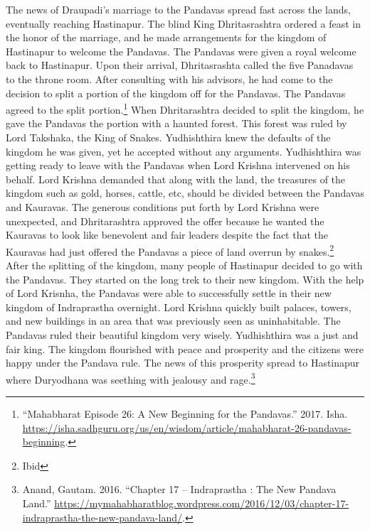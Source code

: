 \documentclass[10pt, letterpaper]{article}
\begin{document}
The news of Draupadi's marriage to the Pandavas spread fast across the
lands, eventually reaching Hastinapur. The blind King Dhritasrashtra
ordered a feast in the honor of the marriage, and he made arrangements
for the kingdom of Hastinapur to welcome the Pandavas. The Pandavas were
given a royal welcome back to Hastinapur. Upon their arrival,
Dhritasrashta called the five Panadavas to the throne room. After
consulting with his advisors, he had come to the decision to split a
portion of the kingdom off for the Pandavas. The Pandavas agreed to the
split portion.\footnote{``Mahabharat Episode 26: A New Beginning for the
  Pandavas.'' 2017. Isha.
  \href{https://isha.sadhguru.org/us/en/wisdom/article/mahabharat-26-pandavas-beginning}{\underline{https://isha.sadhguru.org/us/en/wisdom/article/mahabharat-26-pandavas-beginning}}.}
When Dhritarashtra decided to split the kingdom, he gave the Pandavas
the portion with a haunted forest. This forest was ruled by Lord
Takshaka, the King of Snakes. Yudhishthira knew the defaults of the
kingdom he was given, yet he accepted without any arguments.
Yudhishthira was getting ready to leave with the Pandavas when Lord
Krishna intervened on his behalf. Lord Krishna demanded that along with
the land, the treasures of the kingdom such as gold, horses, cattle,
etc, should be divided between the Pandavas and Kauravas. The generous
conditions put forth by Lord Krishna were unexpected, and Dhritarashtra
approved the offer because he wanted the Kauravas to look like
benevolent and fair leaders despite the fact that the Kauravas had just
offered the Pandavas a piece of land overrun by snakes.\footnote{Ibid} \\

After the splitting of the kingdom, many people of Hastinapur decided to
go with the Pandavas. They started on the long trek to their new
kingdom. With the help of Lord Krisnha, the Pandavas were able to
successfully settle in their new kingdom of Indraprastha overnight. Lord
Krishna quickly built palaces, towers, and new buildings in an area that
was previously seen as uninhabitable. The Pandavas ruled their beautiful
kingdom very wisely. Yudhishthira was a just and fair king. The kingdom
flourished with peace and prosperity and the citizens were happy under
the Pandava rule. The news of this prosperity spread to Hastinapur where
Duryodhana was seething with jealousy and rage.\footnote{Anand, Gautam.
  2016. ``Chapter 17 -- Indraprastha : The New Pandava Land.''
  \href{https://mymahabharatblog.wordpress.com/2016/12/03/chapter-17-indraprastha-the-new-pandava-land/}{\underline{https://mymahabharatblog.wordpress.com/2016/12/03/chapter-17-indraprastha-the-new-pandava-land/}}.} \\
\end{document}
